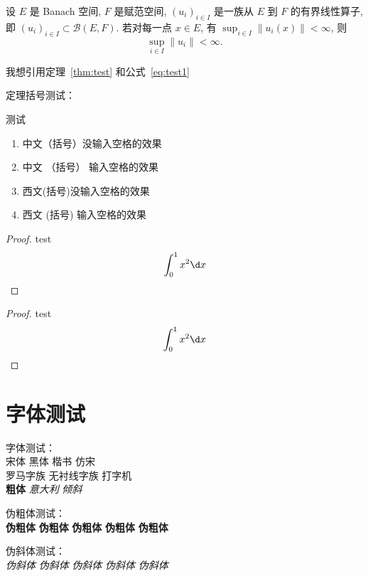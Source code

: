 \documentclass[type = master]{whu-thesis}
\begin{document}
\begin{theorem}\label{thm:test}
  设 $E$ 是 Banach 空间, $F$ 是赋范空间, $(u_i)_{i\in I}$ 是一族从 $E$ 到 $F$ 的有界线性算子,
  即 $(u_i)_{i\in I}\subset \mathcal{B}(E,F)$. 若对每一点 $x\in E$, 有
  $\sup_{i\in I} \|u_i(x)\|<\infty$, 则
  \begin{equation}\label{eq:test1}
    \sup_{i\in I} \|u_i\| < \infty.
  \end{equation}
\end{theorem}

我想引用定理~\ref{thm:test} 和公式~\ref{eq:test1}


定理括号测试：

\begin{theorem}
  测试
  \begin{enumerate}
    \item 中文（括号）没输入空格的效果
    \item 中文 （括号） 输入空格的效果
    \item 西文(括号)没输入空格的效果
    \item 西文 (括号) 输入空格的效果
  \end{enumerate}
\end{theorem} 


\begin{proof}
  test
  \[
    \int_{0}^{1} x^2 \d x
  \]
\end{proof}

\begin{proof}
  test
  \[
    \int_{0}^{1} x^2 \d x \qedhere
  \]
\end{proof}


\section{字体测试}
字体测试：\\
{宋体} {\heiti 黑体} {\kaishu 楷书} {\fangsong 仿宋}\\
{\rmfamily 罗马字族} {\sffamily 无衬线字族} {\ttfamily 打字机}\\
{\bfseries 粗体} {\itshape 意大利} {\slshape 倾斜}

伪粗体测试：\\
{\bfseries\songti 伪粗体} {\bfseries\kaishu 伪粗体} {\bfseries\heiti 伪粗体} {\bfseries\fangsong 伪粗体} {\bfseries 伪粗体}

伪斜体测试：\\
{\itshape\songti 伪斜体} {\itshape\kaishu 伪斜体} {\itshape\heiti 伪斜体} {\itshape\fangsong 伪斜体} {\itshape 伪斜体}
\end{document}
